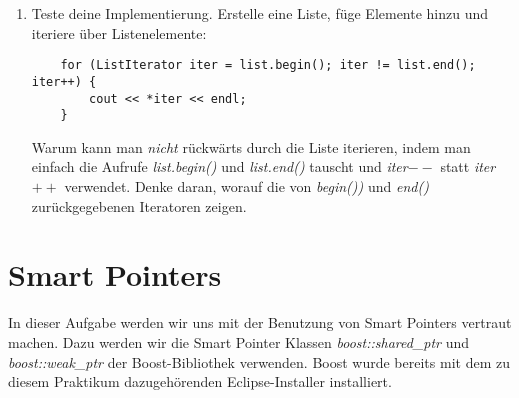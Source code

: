 \begin{enumerate}
\item
Teste deine Implementierung.
Erstelle eine Liste, füge Elemente hinzu und iteriere über Listenelemente:

\begin{lstlisting}
	for (ListIterator iter = list.begin(); iter != list.end(); iter++) {
		cout << *iter << endl;
	}
\end{lstlisting}

Warum kann man \emph{nicht} rückwärts durch die Liste iterieren, indem man einfach die Aufrufe \emph{list.begin()} und \emph{list.end()} tauscht und \emph{iter$--$} statt \emph{iter$++$} verwendet.
Denke daran, worauf die von \emph{begin())} und \emph{end()} zurückgegebenen Iteratoren zeigen.

\end{enumerate}

\section{Smart Pointers}
In dieser Aufgabe werden wir uns mit der Benutzung von Smart Pointers vertraut machen. Dazu werden wir die Smart Pointer Klassen \emph{boost::shared\_ptr} und \emph{boost::weak\_ptr} der Boost-Bibliothek verwenden.
Boost wurde bereits mit dem zu diesem Praktikum dazugehörenden Eclipse-Installer installiert. 

